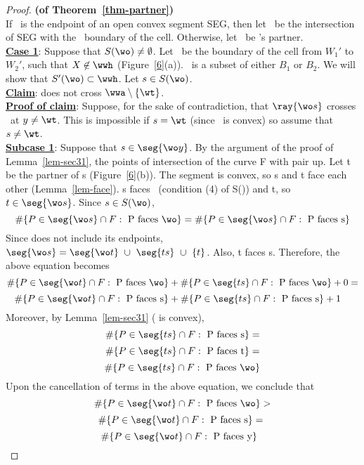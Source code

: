 %
%
\begin{proof}{\bf (of Theorem~\ref{thm-partner})  }\\ \nopagebreak
If \wo\ is the endpoint of an open convex segment SEG, 
then let \wt\ be the intersection of SEG with the \artificial\ boundary
of the cell.
Otherwise, let \wt\ be \wo's partner.\\
\underline{{\bf Case 1}}: Suppose that $S(\wo) \neq \emptyset$.
Let \wwh\ be the boundary of the cell 
from $W_{1}'$ to $W_{2}'$, such that $X \not\in \wwh$
(Figure~\ref{6}(a)).
\wwh\ is a subset of either $B_{1}$ or 
%
%
$B_{2}$.
We will show that $S'(\wo) \subset \wwh$.
Let $s \in S(\wo)$.\\
\underline{{\bf Claim}}:  does not cross 
$\wwa \setminus \{\wt\}$.\\
\underline{{\bf Proof of claim}}:
Suppose, for the sake of contradiction, that $\ray{\wo s}$ crosses \wwa\
at $y \neq \wt$.
This is impossible if $s = \wt$ (since \wwa\ is convex) so assume that
%
%
$s \neq \wt$.\\
\underline{{\bf Subcase 1}}: Suppose that $s \in {}$.
By the argument of the proof of Lemma~\ref{lem-sec31}, the
points of intersection of the curve F with \seg{\wo y} pair up.
Let t be the partner of s (Figure~\ref{6}(b)).
The segment  is convex, so s and t face each 
other (Lemma~\ref{lem-face}).
s faces \wo\ (condition (4) of S(\wo)) and t, so
$t \in \seg{\wo s}$.
Since \mbox{$s \in S(\wo)$}, 
\[ \#\{P \in \seg{\wo s} \cap F: \mbox{ P faces \wo}\}
= \#\{P \in {} \cap F: \mbox{ P faces s}\} \]
Since \seg{\wo s} does not include its endpoints,
$\seg{\wo s} = \seg{\wo t}\ \cup\ \seg{ts}\ \cup\ \{t\}$.
Also, t faces s.
Therefore, the above equation becomes 
\[ \#\{P \in \seg{\wo t} \cap F: \mbox{ P faces \wo}\} +
\#\{P \in \seg{ts} \cap F: \mbox{ P faces \wo}\} + 0 =  \]
\[ \#\{P \in \seg{\wo t} \cap F: \mbox{ P faces s}\} +
\#\{P \in \seg{ts} \cap F: \mbox{ P faces s}\} + 1\ \ \  \]
Moreover, by Lemma~\ref{lem-sec31} ( is convex),\newpage
\[ \#\{P \in \seg{ts} \cap F: \mbox{ P faces s}\} = \]
\[ \#\{P \in \seg{ts} \cap F: \mbox{ P faces t}\} = \]
\[ \#\{P \in \seg{ts} \cap F: \mbox{ P faces \wo} \} \]
Upon the cancellation of terms in the above equation, we conclude that
\[ \#\{P \in \seg{\wo t} \cap F: \mbox{ P faces \wo}\} > \]
\[ \#\{P \in \seg{\wo t} \cap F: \mbox{ P faces s}\} =\  \]
\[ \#\{P \in \seg{\wo t} \cap F: \mbox{ P faces y}\}\ \  \]

\end{proof}
